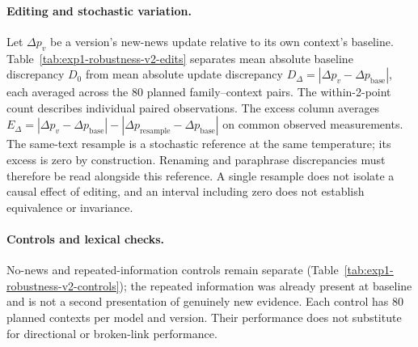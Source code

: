 \paragraph{Editing and stochastic variation.}
Let $\Delta p_v$ be a version's new-news update relative to its own context's
baseline. Table~\ref{tab:exp1-robustness-v2-edits} separates mean absolute
baseline discrepancy $D_0$ from mean absolute update discrepancy
$D_\Delta=|\Delta p_v-\Delta p_{\mathrm{base}}|$, each averaged across the
80 planned family--context pairs. The within-2-point count describes individual paired observations.
The excess column averages
$E_\Delta=|\Delta p_v-\Delta p_{\mathrm{base}}|
-|\Delta p_{\mathrm{resample}}-\Delta p_{\mathrm{base}}|$
on common observed measurements. The same-text resample is a stochastic
reference at the same temperature; its excess is zero by construction.
Renaming and paraphrase discrepancies must therefore be read alongside this
reference. A single resample does not isolate a causal effect of editing,
and an interval including zero does not establish equivalence or invariance.

\begin{center}
\begin{minipage}{\linewidth}
\centering
{}
\label{tab:exp1-robustness-v2-edits}
\small
\resizebox{\linewidth}{!}{}
\end{minipage}
\end{center}

\paragraph{Controls and lexical checks.}
No-news and repeated-information controls remain separate
(Table~\ref{tab:exp1-robustness-v2-controls}); the repeated information was already
present at baseline and is not a second presentation of genuinely new evidence.
Each control has 80 planned contexts per model and version. Their performance
does not substitute for directional or broken-link performance.

